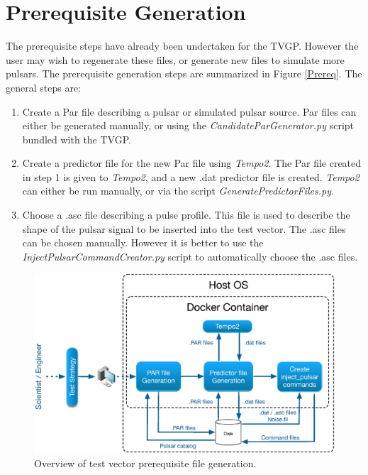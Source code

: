 \documentclass[preprint,authoryear,5p,twocolumn]{elsarticle_mod}
\begin{document}
\section{Prerequisite Generation}
The prerequisite steps have already been undertaken for the TVGP. However the user may wish to regenerate these files, or generate new files to simulate more pulsars. The prerequisite generation steps are summarized in Figure \ref{Prereq}. The general steps are: 
\begin{enumerate}
\item Create a Par file describing a pulsar or simulated pulsar source. Par files can either be generated manually, or using the \textit{CandidateParGenerator.py} script bundled with the TVGP. 
\item Create a predictor file for the new Par file using \textit{Tempo2}. The Par file created in step 1 is given to \textit{Tempo2}, and a new .dat predictor file is created. \textit{Tempo2} can either be run manually, or via the script \textit{GeneratePredictorFiles.py}. 
\item Choose a .asc file describing a pulse profile. This file is used to describe the shape of the pulsar signal to be inserted into the test vector. The .asc files can be chosen manually. However it is better to use the \textit{InjectPulsarCommandCreator.py} script to automatically choose the .asc files.
\end{enumerate}
\begin{figure}
	\centering
		\includegraphics[scale=0.4]{images/eps/DataFlow.eps}
		\caption[]{Overview of test vector prerequisite file generation.}
	\label{Fig:Prereq}
\end{figure}
\end{document}
